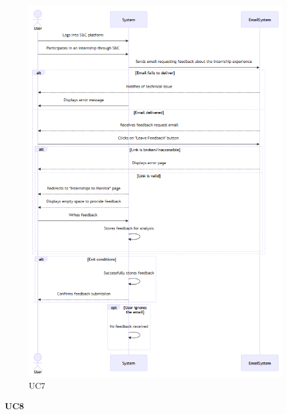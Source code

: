 \begin{figure}[H]
    \centering
    \includegraphics[width=0.8\linewidth]{RASD//Images/UC7.png}
    \caption{UC7}
\end{figure}

\pagebreak
\textbf{UC8}

